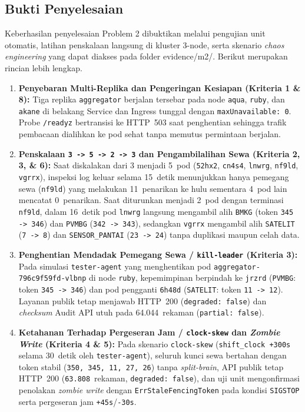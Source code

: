 \subsection{Bukti Penyelesaian}
Keberhasilan penyelesaian Problem 2 dibuktikan melalui pengujian unit otomatis, latihan penskalaan langsung di kluster 3-node, serta skenario \textit{chaos engineering} yang dapat diakses pada folder evidence/m2/. Berikut merupakan rincian lebih lengkap.
\begin{enumerate}
    \item \textbf{Penyebaran Multi-Replika dan Pengeringan Kesiapan (Kriteria 1 \& 8):} Tiga replika \texttt{aggregator} berjalan tersebar pada node \texttt{aqua}, \texttt{ruby}, dan \texttt{akane} di belakang Service dan Ingress tunggal dengan \texttt{maxUnavailable: 0}. Probe \texttt{/readyz} bertransisi ke HTTP~503 saat penghentian sehingga trafik pembacaan dialihkan ke pod sehat tanpa memutus permintaan berjalan.
    \item \textbf{Penskalaan \texttt{3 -> 5 -> 2 -> 3} dan Pengambilalihan Sewa (Kriteria 2, 3, \& 6):} Saat diskalakan dari 3 menjadi 5~pod (\texttt{52hx2}, \texttt{cn4s4}, \texttt{lnwrg}, \texttt{nf9ld}, \texttt{vgrrx}), inspeksi log keluar selama 15~detik menunjukkan hanya pemegang sewa (\texttt{nf9ld}) yang melakukan 11~penarikan ke hulu sementara 4~pod lain mencatat 0~penarikan. Saat diturunkan menjadi 2~pod dengan terminasi \texttt{nf9ld}, dalam 16~detik pod \texttt{lnwrg} langsung mengambil alih \texttt{BMKG} (token \texttt{345 -> 346}) dan \texttt{PVMBG} (\texttt{342 -> 343}), sedangkan \texttt{vgrrx} mengambil alih \texttt{SATELIT} (\texttt{7 -> 8}) dan \texttt{SENSOR\_PANTAI} (\texttt{23 -> 24}) tanpa duplikasi maupun celah data.
    \item \textbf{Penghentian Mendadak Pemegang Sewa / \texttt{kill-leader} (Kriteria 3):} Pada simulasi \texttt{tester-agent} yang menghentikan pod \texttt{aggregator-796c9f59fd-vlbnp} di node \texttt{ruby}, kepemimpinan berpindah ke \texttt{jrzrd} (\texttt{PVMBG}: token \texttt{345 -> 346}) dan pod pengganti \texttt{6h48d} (\texttt{SATELIT}: token \texttt{11 -> 12}). Layanan publik tetap menjawab HTTP~200 (\texttt{degraded: false}) dan \textit{checksum} Audit API utuh pada 64.044~rekaman (\texttt{partial: false}).
    \item \textbf{Ketahanan Terhadap Pergeseran Jam / \texttt{clock-skew} dan \textit{Zombie Write} (Kriteria 4 \& 5):} Pada skenario \texttt{clock-skew} (\texttt{shift\_clock +300s} selama 30~detik oleh \texttt{tester-agent}), seluruh kunci sewa bertahan dengan token stabil (\texttt{350, 345, 11, 27, 26}) tanpa \textit{split-brain}, API publik tetap HTTP~200 (\texttt{63.808}~rekaman, \texttt{degraded: false}), dan uji unit mengonfirmasi penolakan \textit{zombie write} dengan \texttt{ErrStaleFencingToken} pada kondisi \texttt{SIGSTOP} serta pergeseran jam \texttt{+45s}/\texttt{-30s}.

\end{enumerate}
